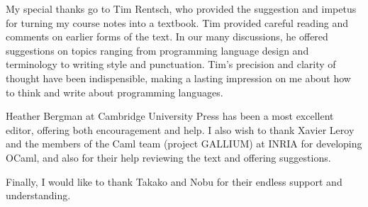 My special thanks go to Tim Rentsch, who provided the suggestion and impetus for turning my course
notes into a textbook.  Tim provided careful reading and comments on earlier forms of the text.  In
our many discussions, he offered suggestions on topics ranging from programming language design and
terminology to writing style and punctuation.  Tim's precision and clarity of thought have been
indispensible, making a lasting impression on me about how to think and write about programming languages.

Heather Bergman at Cambridge University Press has been a most excellent editor, offering both
encouragement and help.
I also wish to thank Xavier Leroy and the members of the Caml team (project GALLIUM) at INRIA for
developing OCaml, and also for their help reviewing the text and offering suggestions.

Finally, I would like to thank Takako and Nobu for their endless support and
understanding.


